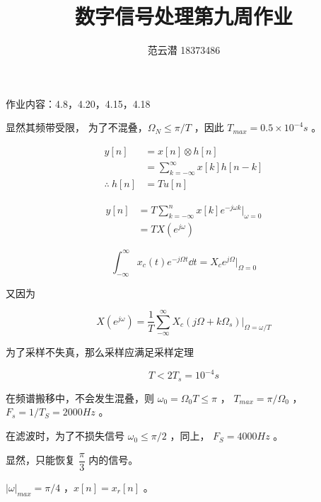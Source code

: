 \documentclass[lang=cn,11pt,a4paper,cite=authoryear,twocolumn]{elegantpaper}
\title{数字信号处理\quad 第九周作业}
\author{范云潜 18373486}
\institute{微电子学院 184111 班}
\date{\zhtoday}
\begin{document}
\maketitle

作业内容：4.8，4.20，4.15，4.18



显然其频带受限， 为了不混叠，\(\Omega_N \leq \pi/T\) ，因此 \(T_{max} = 0.5 \times 10^{-4} s\) 。


\[\begin{aligned}
    y[n] &= x[n] \otimes h[n] \\
    &= \sum_{k=-\infty}^\infty x[k] h[n-k] \\
    \therefore\: h[n] &= T u[n]
\end{aligned}\]


\[\begin{aligned}
    y[n] &= T \sum_{k = -\infty} ^{n} x[k] e^{-j\omega k} |_{\omega = 0} \\ 
    &= T X(e^{j\omega})
\end{aligned}\]


\[\int_{-\infty} ^\infty x_c(t) e^{-j \Omega t} \dd{t} = X_c{e^{j\Omega}} |_{\Omega = 0}\] 

又因为

\[X(e^{j\omega}) = \frac{1}{T} \sum_{-\infty} ^\infty X_c(j \Omega + k \Omega_s) |_{\Omega = \omega / T}\] 

为了采样不失真，那么采样应满足采样定理

\[T < 2 T_s = 10^{-4} s \] 



在频谱搬移中，不会发生混叠，则 \(\omega_0 = \Omega_0 T \leq \pi \) ， \(T_{max} = \pi / \Omega_0\) ， \(F_s = 1/T_S = 2000 Hz\) 。


在滤波时，为了不损失信号 \(\omega_0 \leq \pi / 2\) ，同上， \(F_S = 4000 Hz\) 。


显然，只能恢复 \(\dfrac{\pi}{3}\) 内的信号。


\(|\omega|_{max} = \pi/4\) ，\(x[n] = x_r[n]\) 。

\end{document}
